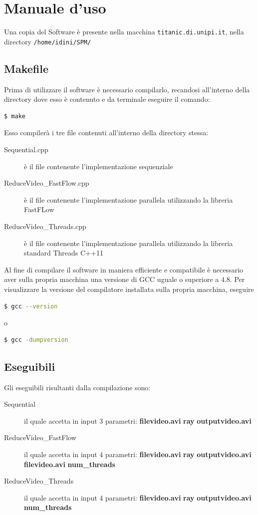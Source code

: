 \documentclass[12pt]{article}
\begin{document}
\section{Manuale d'uso} \label{App:AppendixA}
Una copia del Software \`e presente nella macchina \texttt{titanic.di.unipi.it}, nella directory \texttt{/home/idini/SPM/}
\subsection{Makefile}
Prima di utilizzare il software \`e necessario compilarlo, recandosi all'interno della directory dove esso \`e contenuto e da terminale eseguire il comando:
\begin{lstlisting}[language=bash]
  $ make
\end{lstlisting}
Esso compiler\`a i tre file contenuti all'interno della directory stessa: 
\begin{description}
\item[Sequential.cpp] \`e il file contenente l'implementazione sequenziale
\item[ReduceVideo\_FastFlow.cpp] \`e il file contenente l'implementazione parallela utilizzando la libreria FastFLow
\item[ReduceVideo\_Threads.cpp] \`e il file contenente l'implementazione parallela utilizzando la libreria standard Threads C++11
\end{description}
Al fine di compilare il software in maniera efficiente e compatibile \`e necessario aver sulla propria macchina una versione di GCC uguale o superiore a 4.8. Per visualizzare la versione del compilatore installata sulla propria macchina, eseguire 
\begin{lstlisting}[language=bash]
  $ gcc --version
\end{lstlisting}
o
\begin{lstlisting}[language=bash]
  $ gcc -dumpversion
\end{lstlisting}

\subsection{Eseguibili}
Gli eseguibili risultanti dalla compilazione sono:
\begin{description}
\item[Sequential] il quale accetta in input 3 parametri: \textbf{filevideo.avi} \textbf{ray} \textbf{outputvideo.avi}
\item[ReduceVideo\_FastFlow] il quale accetta in input 4 parametri: \textbf{filevideo.avi} \textbf{ray} \textbf{outputvideo.avi} \textbf{filevideo.avi} \textbf{num\_threads} 
\item[ReduceVideo\_Threads] il quale accetta in input 4 parametri: \textbf{filevideo.avi} \textbf{ray} \textbf{outputvideo.avi} \textbf{num\_threads} 
\end{description}
\end{document}
